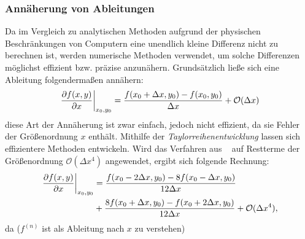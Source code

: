 \subsubsection{Annäherung von Ableitungen}

Da im Vergleich zu analytischen Methoden aufgrund der physischen Beschränkungen von Computern eine unendlich kleine Differenz nicht zu berechnen ist, werden numerische Methoden verwendet, um solche Differenzen möglichst effizient bzw. präzise anzunähern.
Grundsätzlich ließe sich eine Ableitung folgendermaßen annähern:
\begin{align*}
    \left.\frac{\partial f(x,y)}{\partial x}\right\vert_{x_0 , y_0} = \frac{f(x_0 +\Delta x,y_0)-f(x_0,y_0)}{\Delta x} + \mathcal{O}(\Delta x)
\end{align*}
diese Art der Annäherung ist zwar einfach, jedoch nicht effizient, da sie Fehler der Größenordnung $x$ enthält. Mithilfe der \emph{Taylorreihenentwicklung} lassen sich effizientere Methoden entwickeln. Wird das Verfahren aus ~\cite[S. ~51f.]{lecheler_computational_2022} auf Restterme der Größenordnung $\mathcal{O}(\Delta x^4)$ angewendet, ergibt sich folgende Rechnung:
\begin{equation}
\begin{align*}
\label{naeherung4}
    \left. \frac{\partial f(x,y)}{\partial x} \right\vert_{x_0,y_0} &= \frac{f(x_0-2\Delta x,y_0) - 8 f(x_0 -\Delta x,y_0)}{12\Delta x} \\
    &+ \frac{8f(x_0+\Delta x, y_0) - f(x_0 + 2\Delta x, y_0)}{12\Delta x} + \mathcal{O}(\Delta x^4),
\end{align*}
\end{equation}
da ($f^{(n)}$ ist als Ableitung nach $x$ zu verstehen)
